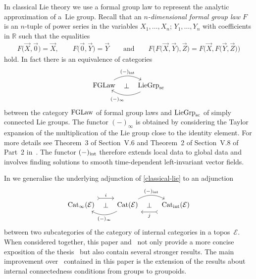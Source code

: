 \documentclass[pdftex]{sigma}
\numberwithin{equation}{section}
\begin{document}
In classical Lie theory we use a formal group law to represent the analytic approximation of a~Lie group. Recall that an \emph{$n$-dimensional formal group law $F$} is an $n$-tuple of power series in the variables $X_{1},\dots ,X_{n}$; $Y_{1},\dots ,Y_{n}$ with coef\/f\/icients in $\mathbb{R}$ such that the equalities
\begin{gather*}
F\big(\vec{X},\vec{0}\big)=\vec{X},\qquad F\big(\vec{0},\vec{Y}\big)=\vec{Y}\qquad \text{and} \qquad F\big(F\big(\vec{X},\vec{Y}\big),\vec{Z}\big)=F\big(\vec{X},F\big(\vec{Y},\vec{Z}\big)\big)
\end{gather*}
hold. In fact there is an equivalence of categories
\begin{equation}\label{classical-lie}
\begin{tikzcd}
 {\rm FGLaw} \rar[bend left]{(-)_{\rm int}} \rar[phantom]{\perp} & {{\rm LieGrp}_{\rm sc}} \lar[bend left]{(-)_{\infty}}
\end{tikzcd}
\end{equation}
between the category ${\rm FGLaw}$ of formal group laws and ${\rm LieGrp}_{\rm sc}$ of simply connected Lie groups. The functor $(-)_{\infty}$ is obtained by considering the Taylor expansion of the multiplication of the Lie group close to the identity element. For more details see Theorem~3 of Section~V.6 and Theorem~2 of Section~V.8 of Part~2 in~\cite{MR2179691}. The functor $(-)_{\rm int}$ therefore extends local data to global data and involves f\/inding solutions to smooth time-dependent left-invariant vector f\/ields.

In \cite{burke-relative-to-local-models} we generalise the underlying adjunction of \eqref{classical-lie} to an adjunction
\begin{equation}\label{new-lie-adjunction}
 \begin{tikzcd}
 {\rm Cat}_{\infty}(\mathcal{E}) \rar[phantom]{\perp} \rar[yshift=10,rightarrowtail]{i} & {\rm Cat}(\mathcal{E}) \rar[bend left]{(-)_{\rm int}} \lar[bend left]{(-)_{\infty}} & \lar[phantom]{\perp} \, {\rm Cat}_{\rm int}(\mathcal{E}) \lar[yshift=-10,rightarrowtail]{j}
 \end{tikzcd}
 \end{equation}
between two subcategories of the category of internal categories in a topos~$\mathcal{E}$. When considered together, this paper and~\cite{burke-relative-to-local-models} not only provide a more concise exposition of the thesis~\cite{BurkeThesis} but also contain several stronger results. The main improvement over~\cite{BurkeThesis} contained in this paper is the extension of the results about internal connectedness conditions from groups to groupoids.
\end{document}
